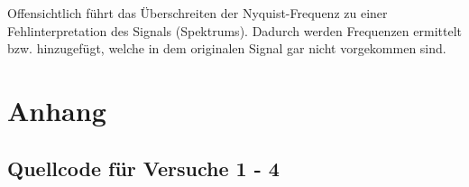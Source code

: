 \documentclass[12pt,oneside,a4paper]{report}
\begin{document}
Offensichtlich führt das Überschreiten der Nyquist-Frequenz zu einer Fehlinterpretation des Signals (Spektrums). Dadurch werden Frequenzen ermittelt bzw. hinzugefügt, welche in dem originalen Signal gar nicht vorgekommen sind.

%
%
\renewcommand\thesection{A.\arabic{section}}
\renewcommand\thesubsection{\thesection.\arabic{subsection}}

\chapter*{Anhang}
\label{chap:APPENDIX}
\addtocounter{chapter}{1}
\setcounter{section}{0}

\section{Quellcode für Versuche 1 - 4}
\label{chap:APPENDIX_SOURCECODE}
\end{document}
